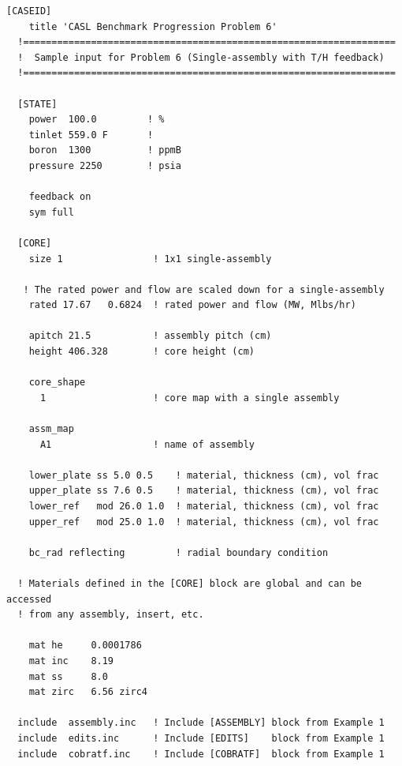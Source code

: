 %
%
%
\begin{Verbatim}[fontsize=\small]
  [CASEID]
    title 'CASL Benchmark Progression Problem 6'
  !==================================================================
  !  Sample input for Problem 6 (Single-assembly with T/H feedback)
  !==================================================================

  [STATE]
    power  100.0         ! %
    tinlet 559.0 F       !
    boron  1300          ! ppmB
    pressure 2250        ! psia

    feedback on
    sym full

  [CORE]
    size 1                ! 1x1 single-assembly

   ! The rated power and flow are scaled down for a single-assembly
    rated 17.67   0.6824  ! rated power and flow (MW, Mlbs/hr)

    apitch 21.5           ! assembly pitch (cm)
    height 406.328        ! core height (cm)

    core_shape
      1                   ! core map with a single assembly

    assm_map
      A1                  ! name of assembly

    lower_plate ss 5.0 0.5    ! material, thickness (cm), vol frac
    upper_plate ss 7.6 0.5    ! material, thickness (cm), vol frac
    lower_ref   mod 26.0 1.0  ! material, thickness (cm), vol frac
    upper_ref   mod 25.0 1.0  ! material, thickness (cm), vol frac

    bc_rad reflecting         ! radial boundary condition

  ! Materials defined in the [CORE] block are global and can be accessed
  ! from any assembly, insert, etc.

    mat he     0.0001786
    mat inc    8.19
    mat ss     8.0
    mat zirc   6.56 zirc4

  include  assembly.inc   ! Include [ASSEMBLY] block from Example 1
  include  edits.inc      ! Include [EDITS]    block from Example 1
  include  cobratf.inc    ! Include [COBRATF]  block from Example 1

\end{Verbatim}
